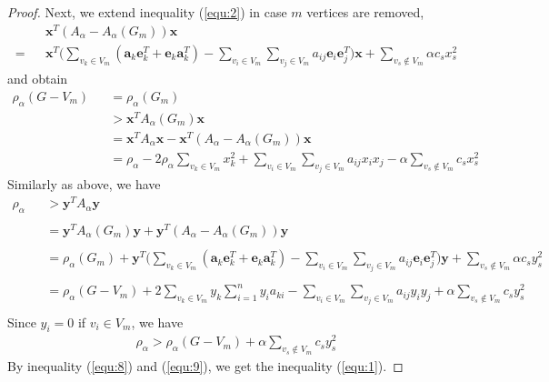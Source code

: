 \documentclass[amsthm]{elsart}
\begin{document}
\begin{proof}
Next, we extend inequality (\ref{equ:2}) in case $m$ vertices are removed,
\begin{eqnarray*}
  &&\textbf{x}^T(A_\alpha - A_\alpha(G_m))\textbf{x}
\\ = &&\textbf{x}^T \Big(\sum \limits_{v_k \in V_m}^{} (\textbf{a}_k \textbf{e}_k^T + \textbf{e}_k \textbf{a}_k^T)
- \sum \limits_{v_i \in V_m}^{} \sum \limits_{v_j \in V_m}^{} a_{ij} \textbf{e}_i \textbf{e}_j^T \Big) \textbf{x}
+ \sum \limits_{v_s \notin V_m}^{} \alpha c_s x_s^2
\end{eqnarray*}
and obtain \\
\begin{eqnarray}
\nonumber \rho_\alpha(G - V_m)
&&= \rho_\alpha(G_m)
\\ \nonumber &&> \textbf{x}^T A_\alpha(G_m) \textbf{x}
\\ \nonumber &&= \textbf{x}^T A_\alpha \textbf{x} - \textbf{x}^T(A_\alpha - A_\alpha(G_m))\textbf{x}
\\ \label{equ:8} &&= \rho_\alpha
   - 2 \rho_\alpha \sum \limits_{v_k \in V_m}^{} x_k^2
   + \sum \limits_{v_i \in V_m}^{} \sum \limits_{v_j \in V_m}^{} a_{ij} x_i x_j
   - \alpha \sum \limits_{v_s \notin V_m}^{} c_s x_s^2
\end{eqnarray}
Similarly as above, we have
\begin{eqnarray*}
\rho_\alpha
&&> \textbf{y} ^T A_\alpha \textbf{y} \\
\\ &&= \textbf{y} ^T A_\alpha(G_m) \textbf{y} + \textbf{y}^T (A_\alpha - A_\alpha(G_m)) \textbf{y} \\
\\ &&= \rho_\alpha(G_m) + \textbf{y}^T \Big(\sum \limits_{v_k \in V_m}^{} (\textbf{a}_k \textbf{e}_k^T + \textbf{e}_k \textbf{a}_k^T)
  - \sum \limits_{v_i \in V_m}^{} \sum \limits_{v_j \in V_m}^{} a_{ij} \textbf{e}_i \textbf{e}_j^T \Big) \textbf{y}
  + \sum \limits_{v_s \notin V_m}^{} \alpha c_s y_s^2 \\
\\ &&= \rho_\alpha(G - V_m)
  + 2 \sum \limits_{v_k \in V_m}^{} y_k \sum \limits_{i=1}^{n}y_i a_{ki}
  - \sum \limits_{v_i \in V_m}^{} \sum \limits_{v_j \in V_m}^{} a_{ij} y_i y_j
  + \alpha \sum \limits_{v_s \notin V_m}^{} c_s y_s^2 \\
\end{eqnarray*}
Since $y_i = 0$ if $v_i \in V_m$, we have
\begin{eqnarray} \label{equ:9}
\rho_\alpha
> \rho_\alpha(G - V_m) + \alpha \sum \limits_{v_s \notin V_m}^{} c_s y_s^2
\end{eqnarray}
By inequality (\ref{equ:8}) and (\ref{equ:9}), we get the inequality (\ref{equ:1}).
\end{proof}
\end{document}
